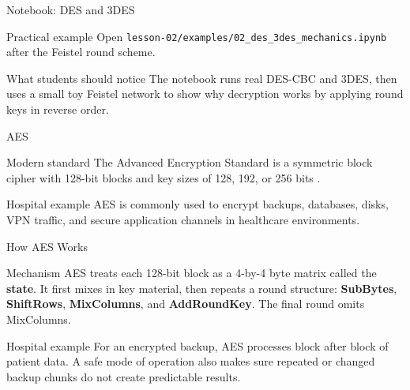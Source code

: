 \documentclass[presentation]{beamer}
\begin{document}
\begin{frame}[c]{Notebook: DES and 3DES}
\begin{block}{Practical example}
Open \texttt{lesson-02/examples/02\_des\_3des\_mechanics.ipynb} after the Feistel round scheme.
\end{block}

\begin{exampleblock}{What students should notice}
The notebook runs real DES-CBC and 3DES, then uses a small toy Feistel network to show why
decryption works by applying round keys in reverse order.
\end{exampleblock}
\end{frame}

\begin{frame}[c]{AES}
\begin{block}{Modern standard}
The Advanced Encryption Standard is a symmetric block cipher with 128-bit blocks and key sizes of
128, 192, or 256 bits \cite{nist_fips_197}.
\end{block}

\begin{exampleblock}{Hospital example}
AES is commonly used to encrypt backups, databases, disks, VPN traffic, and secure application
channels in healthcare environments.
\end{exampleblock}
\end{frame}

\begin{frame}[c]{How AES Works}
\begin{block}{Mechanism}
AES treats each 128-bit block as a 4-by-4 byte matrix called the \textbf{state}. It first mixes in
key material, then repeats a round structure: \textbf{SubBytes}, \textbf{ShiftRows},
\textbf{MixColumns}, and \textbf{AddRoundKey}. The final round omits MixColumns.
\end{block}

\begin{exampleblock}{Hospital example}
For an encrypted backup, AES processes block after block of patient data. A safe mode of operation
also makes sure repeated or changed backup chunks do not create predictable results.
\end{exampleblock}
\end{frame}
\end{document}
